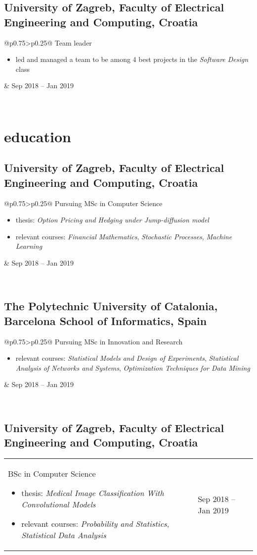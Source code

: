 \documentclass[a4paper]{article}
\makeatletter
\newlength{\tablewidth}
\newenvironment{period}[2]{%
\newcommand{\sarma}{#2}%
\setlength{\tablewidth}{\linewidth}
\addtolength{\tablewidth}{-2\tabcolsep}
\begin{tabular}{@{}p{0.75\tablewidth}>{\raggedleft\arraybackslash}p{0.25\tablewidth}@{}}%
#1 \newline
\begin{itemize}
}{%
\end{itemize} & \sarma \\%
\end{tabular}\\
}
\makeatother
\begin{document}
\subsection{University of Zagreb, Faculty of Electrical Engineering and Computing, Croatia}
\begin{period}{Team leader}{Sep 2018 -- Jan 2019}
    \item led and managed a team to be among 4 best projects in the \textit{Software Design} class
\end{period}

\section{education}
\subsection{University of Zagreb, Faculty of Electrical Engineering and Computing, Croatia}
\begin{period}{Pursuing MSc in Computer Science}{Sep 2019 -- July 2022}
    \item thesis:
        \textit{Option Pricing and Hedging under Jump-diffusion model}
    \item relevant courses:
        \textit{Financial Mathematics},
        \textit{Stochastic Processes},
        \textit{Machine Learning}
\end{period}
\subsection{The Polytechnic University of Catalonia, Barcelona School of Informatics, Spain}
\begin{period}{Pursuing MSc in Innovation and Research}{Sep 2020 -- Jan 2021}
    \item relevant courses:
        \textit{Statistical Models and Design of Experiments},
        \textit{Statistical Analysis of Networks and Systems},
        \textit{Optimization Techniques for Data Mining}
\end{period}
\subsection{University of Zagreb, Faculty of Electrical Engineering and Computing, Croatia}
\begin{period}{BSc in Computer Science}{Sep 2016 -- Jul 2019}
    \item thesis:
        \textit{Medical Image Classification With Convolutional Models}
    \item relevant courses:
        \textit{Probability and Statistics},
        \textit{Statistical Data Analysis}
\end{period}
\end{document}
